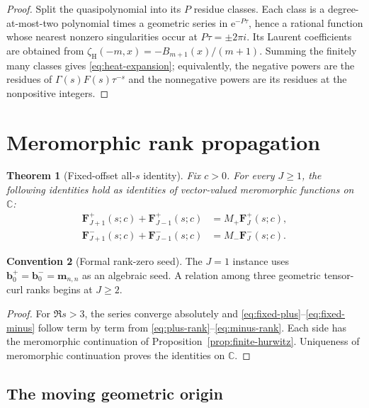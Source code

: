 \documentclass[11pt]{article}
\newtheorem{theorem}{Theorem}[section]
\theoremstyle{definition}
\newtheorem{convention}[theorem]{Convention}
\newcommand{\C}{\mathbb C}
\newcommand{\e}{\mathrm e}
\newcommand{\zH}{\zeta_{\mathrm H}}
\begin{document}
\begin{proof}
Split the quasipolynomial into its $P$ residue classes.  Each class is
a degree-at-most-two polynomial times a geometric series in
$\e^{-P\tau}$, hence a rational function whose nearest nonzero
singularities occur at $P\tau=\pm2\pi i$.  Its Laurent coefficients
are obtained from
$\zH(-m,x)=-B_{m+1}(x)/(m+1)$.  Summing the finitely many classes
gives \eqref{eq:heat-expansion}; equivalently, the negative powers are
the residues of $\Gamma(s)F(s)\tau^{-s}$ and the nonnegative powers
are its residues at the nonpositive integers.
\end{proof}

\section{Meromorphic rank propagation}

\begin{theorem}[Fixed-offset all-$s$ identity]
\label{thm:all-s}
Fix $c>0$.  For every $J\geq1$, the following identities hold as
identities of vector-valued meromorphic functions on $\C$:
\begin{align}
 \boldsymbol F_{J+1}^{+}(s;c)
 +\boldsymbol F_{J-1}^{+}(s;c)
 &=M_+\boldsymbol F_J^{+}(s;c),
 \label{eq:fixed-plus}\\
 \boldsymbol F_{J+1}^{-}(s;c)
 +\boldsymbol F_{J-1}^{-}(s;c)
 &=M_-\boldsymbol F_J^{-}(s;c).
 \label{eq:fixed-minus}
\end{align}
\end{theorem}

\begin{convention}[Formal rank-zero seed]
The $J=1$ instance uses
$\boldsymbol b_0^+=\boldsymbol b_0^-=\boldsymbol m_{n,n}$ as an algebraic
seed.  A relation among three geometric tensor-curl ranks begins at
$J\geq2$.
\end{convention}

\begin{proof}
For $\Re s>3$, the series converge absolutely and
\eqref{eq:fixed-plus}--\eqref{eq:fixed-minus} follow term by term from
\eqref{eq:plus-rank}--\eqref{eq:minus-rank}.  Each side has the
meromorphic continuation of Proposition~\ref{prop:finite-hurwitz}.
Uniqueness of meromorphic continuation proves the identities on
$\C$.
\end{proof}

\subsection{The moving geometric origin}
\end{document}
